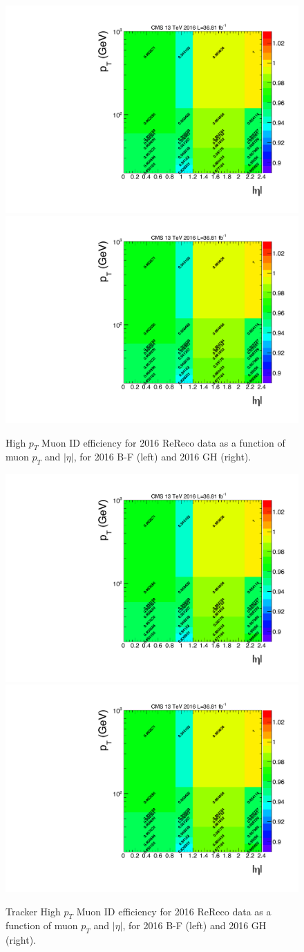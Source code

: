 \begin{figure}[htbp]
\begin{center}
\includegraphics[width=0.49\linewidth, page=1]{figures/bg_muonidisoeff.pdf}
\includegraphics[width=0.49\linewidth, page=2]{figures/bg_muonidisoeff.pdf}
\caption{High $p_T$ Muon ID efficiency for 2016 ReReco data as a function of muon $p_T$ and $|\eta|$, for 2016 B-F (left) and 2016 GH (right).}
\label{fig:bg_muontkideff}
\end{center}
\end{figure}

\begin{figure}[htbp]
\begin{center}
\includegraphics[width=0.49\linewidth, page=3]{figures/bg_muonidisoeff.pdf}
\includegraphics[width=0.49\linewidth, page=4]{figures/bg_muonidisoeff.pdf}
\caption{Tracker High $p_T$ Muon ID efficiency for 2016 ReReco data as a function of muon $p_T$ and $|\eta|$, for 2016 B-F (left) and 2016 GH (right).}
\label{fig:bg_muonideff}
\end{center}
\end{figure}

